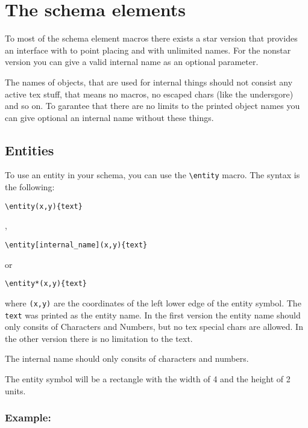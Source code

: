 \documentclass[a4paper,11pt]{article}
\begin{document}
\section{The schema elements}

To most of the schema element macros there exists a star version that
provides an interface with to point placing and with unlimited names.
For the nonstar version you can give a valid internal name as an optional 
parameter.

The names of objects, that are used for internal things should not consist any
active tex stuff, that means no macros, no escaped chars (like the undersgore)
and so on. To garantee that there are no limits to the printed object names 
you can give optional an internal name without these things.

\subsection{Entities}

To use an entity in your schema, you can use the \verb|\entity| macro.
The syntax is the following:

\begin{verbatim}
\entity(x,y){text}
\end{verbatim}

,

\begin{verbatim}
\entity[internal_name](x,y){text}
\end{verbatim}

or 

\begin{verbatim}
\entity*(x,y){text}
\end{verbatim}

where {\tt (x,y)} are the coordinates of the left lower edge of the entity
symbol. The {\tt text} was printed as the entity name. In the first version 
the entity name should only consits of Characters and Numbers, 
but no tex special chars are allowed.
In the other version there is no limitation to the text.

The internal name should only consits of characters and numbers.

The entity symbol will be a rectangle with the width of 4 and the height of 2 
units.

\subsubsection*{Example:}
\end{document}
